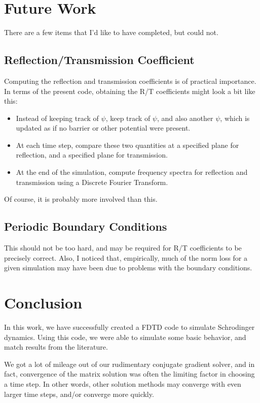 \documentclass[letterpaper,12pt]{article}
\begin{document}
\section{Future Work}

There are a few items that I'd like to have completed, but could not.

\subsection{Reflection/Transmission Coefficient}

Computing the reflection and transmission coefficients is of practical importance.  In terms of the present code, obtaining the R/T coefficients might look a bit like this:

\begin{itemize}
  \item Instead of keeping track of $\psi$, keep track of $\psi$, and also another $\psi$, which is updated as if no barrier or other potential were present.  
  \item At each time step, compare these two quantities at a specified plane for reflection, and a specified plane for transmission.
  \item At the end of the simulation, compute frequency spectra for reflection and transmission using a Discrete Fourier Transform.
 \end{itemize}

Of course, it is probably more involved than this.

\subsection{Periodic Boundary Conditions}

This should not be too hard, and may be required for R/T coefficients to be precisely correct. Also, I noticed that, empirically, much of the norm loss for a given simulation may have been due to problems with the boundary conditions.

\section{Conclusion}

In this work, we have successfully created a FDTD code to simulate Schrodinger dynamics.  Using this code, we were able to simulate some basic behavior, and match results from the literature.  

We got a lot of mileage out of our rudimentary conjugate gradient solver, and in fact, convergence of the matrix solution was often the limiting factor in choosing a time step.  In other words, other solution methods may converge with even larger time steps, and/or converge more quickly.



\end{document}
